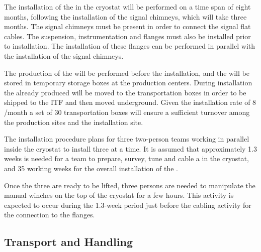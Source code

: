 The installation of the  in the cryostat will be performed on a time span of eight months, following the installation of the signal chimneys, which will take three months. The signal chimneys must be present in order to %
connect the  signal flat cables. The suspension, instrumentation and  flanges must also be  installed prior to  installation. The installation of these flanges can be performed in parallel with the installation of the signal chimneys. 

The production of the  will be performed before the installation, and the  will be stored in temporary storage boxes at the production centers. During installation the already produced  will be moved to the transportation boxes in order to be shipped to the ITF and then moved underground. Given the installation rate of 8 /month a set of \num{30} transportation boxes will ensure a sufficient turnover among the production sites and the installation site.


The installation procedure %
plans for three two-person teams working in parallel inside the cryostat to %
install three  at a time. It is assumed that %
approximately \num{1.3} weeks is needed for a team to prepare, survey, tune and cable a  in the  cryostat, and \num{35} working weeks for the overall installation of the \dptotcrp {}.

Once the three  are ready to be lifted, three persons are needed to manipulate the manual winches on the top of the cryostat for a few hours. This activity is expected to occur during the \num{1.3}-week period just before the cabling activity for the connection to the flanges.


\subsection{Transport and Handling}
\label{sec:fddp-crp-install-transport}

